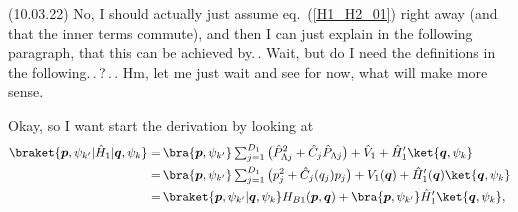 \documentclass{report}
\begin{document}
(10.03.22) No, I should actually just assume eq.\ (\ref{H1_H2_01}) right away (and that the inner terms commute), and then I can just explain in the following paragraph, that this can be achieved by.\,. Wait, but do I need the definitions in the following.\,.\,?\,.\,. Hm, let me just wait and see for now, what will make more sense. 

Okay, so I want start the derivation by looking at 
\begin{align}
\begin{aligned}
	\braket{\boldsymbol{p}, \psi_{k'} | \hat H_1 | \boldsymbol{q}, \psi_k} =&\,
		\bra{\boldsymbol{p}, \psi_{k'}}
			\textstyle\sum_{j=1}^{D_1}\displaystyle
			\big( \hat P_{\Lambda j}^2 + \hat C_j \hat P_{\Lambda j} \big) + 
			\hat V_1 +
			\hat H_1'
		\ket{\boldsymbol{q}, \psi_k}
	\\=&\,
		\bra{\boldsymbol{p}, \psi_{k'}}
			\textstyle\sum_{j=1}^{D_1}\displaystyle
			\big( p_{j}^2 + \hat C_j(q_j) p_{j} \big) + 
			V_1(\boldsymbol{q}) +
			\hat H_{1}'(\boldsymbol{q})
		\ket{\boldsymbol{q}, \psi_k}
	\\=&\,
		\braket{\boldsymbol{p}, \psi_{k'} | \boldsymbol{q}, \psi_k} 
		H_{B1}(\boldsymbol{p}, \boldsymbol{q}) + 
		\bra{\boldsymbol{p}, \psi_{k'}}
			\hat H_{1}'
		\ket{\boldsymbol{q}, \psi_k},
	\label{H1_braket_calc}
\end{aligned}
\end{align}
\end{document}

